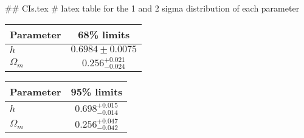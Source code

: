 ## CIs.tex
# latex table for the 1 and 2 sigma distribution of each parameter

\begin{tabular} { l  c}
 Parameter &  68\% limits\\
\hline
{\boldmath$h              $} & $0.6984\pm 0.0075          $\\
{\boldmath$\Omega_m       $} & $0.256^{+0.021}_{-0.024}   $\\
\hline
\end{tabular}

\begin{tabular} { l  c}
 Parameter &  95\% limits\\
\hline
{\boldmath$h              $} & $0.698^{+0.015}_{-0.014}   $\\
{\boldmath$\Omega_m       $} & $0.256^{+0.047}_{-0.042}   $\\
\hline
\end{tabular}
